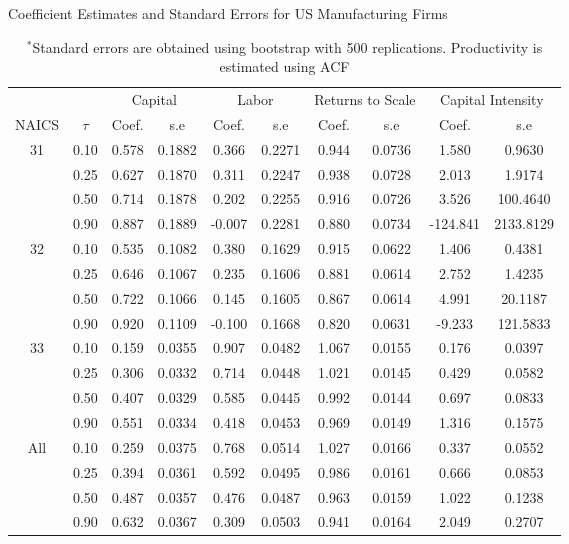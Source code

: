 \documentclass[11pt]{article}
\begin{document}
\begin{table}[H]
\centering
\caption{Coefficient Estimates and Standard Errors for US Manufacturing Firms}
\begin{tabular}{cccccccccc}
  \hline\hline & & \multicolumn{2}{c}{Capital}  & \multicolumn{2}{c}{Labor} & \multicolumn{2}{c}{Returns to Scale} & \multicolumn{2}{c}{Capital Intensity}\\ \cmidrule(lr){3-4} \cmidrule(lr){5-6} \cmidrule(lr){7-8} \cmidrule(lr){9-10}NAICS & $\tau$ & Coef. & s.e & Coef. & s.e & Coef. & s.e & Coef. & s.e \\ 
  \hline
31 & 0.10 & 0.578 & 0.1882 & 0.366 & 0.2271 & 0.944 & 0.0736 & 1.580 & 0.9630 \\ 
   & 0.25 & 0.627 & 0.1870 & 0.311 & 0.2247 & 0.938 & 0.0728 & 2.013 & 1.9174 \\ 
   & 0.50 & 0.714 & 0.1878 & 0.202 & 0.2255 & 0.916 & 0.0726 & 3.526 & 100.4640 \\ 
   & 0.90 & 0.887 & 0.1889 & -0.007 & 0.2281 & 0.880 & 0.0734 & -124.841 & 2133.8129 \\ 
  32 & 0.10 & 0.535 & 0.1082 & 0.380 & 0.1629 & 0.915 & 0.0622 & 1.406 & 0.4381 \\ 
   & 0.25 & 0.646 & 0.1067 & 0.235 & 0.1606 & 0.881 & 0.0614 & 2.752 & 1.4235 \\ 
   & 0.50 & 0.722 & 0.1066 & 0.145 & 0.1605 & 0.867 & 0.0614 & 4.991 & 20.1187 \\ 
   & 0.90 & 0.920 & 0.1109 & -0.100 & 0.1668 & 0.820 & 0.0631 & -9.233 & 121.5833 \\ 
  33 & 0.10 & 0.159 & 0.0355 & 0.907 & 0.0482 & 1.067 & 0.0155 & 0.176 & 0.0397 \\ 
   & 0.25 & 0.306 & 0.0332 & 0.714 & 0.0448 & 1.021 & 0.0145 & 0.429 & 0.0582 \\ 
   & 0.50 & 0.407 & 0.0329 & 0.585 & 0.0445 & 0.992 & 0.0144 & 0.697 & 0.0833 \\ 
   & 0.90 & 0.551 & 0.0334 & 0.418 & 0.0453 & 0.969 & 0.0149 & 1.316 & 0.1575 \\ 
  All & 0.10 & 0.259 & 0.0375 & 0.768 & 0.0514 & 1.027 & 0.0166 & 0.337 & 0.0552 \\ 
   & 0.25 & 0.394 & 0.0361 & 0.592 & 0.0495 & 0.986 & 0.0161 & 0.666 & 0.0853 \\ 
   & 0.50 & 0.487 & 0.0357 & 0.476 & 0.0487 & 0.963 & 0.0159 & 1.022 & 0.1238 \\ 
   & 0.90 & 0.632 & 0.0367 & 0.309 & 0.0503 & 0.941 & 0.0164 & 2.049 & 0.2707 \\ 
   \hline
\end{tabular}
\caption*{\footnotesize $^{*}$Standard errors are obtained using bootstrap with 500 replications. Productivity is estimated using ACF}
\label{USestACF}
\end{table}
\end{document}
